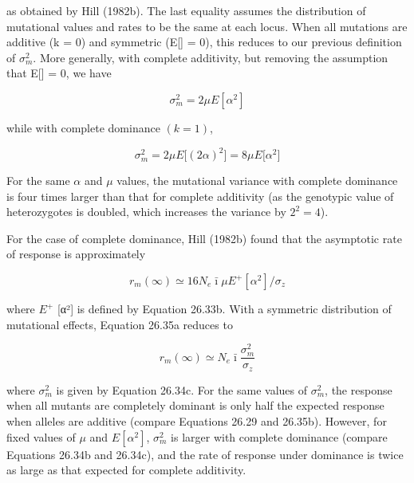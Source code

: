 \documentclass{article}
\begin{document}
{as obtained by Hill (1982b). The last equality assumes the distribution of mutational values and rates to be the same at each locus. When all mutations are additive (k = 0) and symmetric (E[\alpha] = 0), this reduces to our previous definition of  $ \sigma_m^2 $. More generally, with complete additivity, but removing the assumption that E[\alpha] = 0, we have

\begin{equation}
\sigma_{m}^{2}=2\mu E[\alpha^{2}]
\tag{26.34b}
\label{eq:26_34b}
\end{equation}

while with complete dominance  $ (k=1) $,

\begin{equation}
\sigma_{m}^{2}=2\mu E\big[\left(2\alpha\right)^{2}\big]=8\mu E\big[\alpha^{2}\big]
\tag{26.34c}
\label{eq:26_34c}
\end{equation}

For the same  $ \alpha $ and  $ \mu $ values, the mutational variance with complete dominance is four times larger than that for complete additivity (as the genotypic value of heterozygotes is doubled, which increases the variance by  $ 2^2 = 4 $).

For the case of complete dominance, Hill (1982b) found that the asymptotic rate of response is approximately

\begin{equation}
r_{m}(\infty)\simeq16N_{e}\bar{\imath}\mu E^{+}\left[\alpha^{2}\right]/\sigma_{z}
\tag{26.35a}
\label{eq:26_35a}
\end{equation}

where  $ E^{+} $ [α²] is defined by Equation 26.33b. With a symmetric distribution of mutational effects, Equation 26.35a reduces to

\begin{equation}
r_{m}(\infty)\simeq N_{e}\bar{\imath}\frac{\sigma_{m}^{2}}{\sigma_{z}}
\tag{26.35b}
\label{eq:26_35b}
\end{equation}

where  $ \sigma_m^2 $ is given by Equation 26.34c. For the same values of  $ \sigma_m^2 $, the response when all mutants are completely dominant is only half the expected response when alleles are additive (compare Equations 26.29 and 26.35b). However, for fixed values of  $ \mu $ and  $ E\left[\alpha^2\right] $,  $ \sigma_m^2 $ is larger with complete dominance (compare Equations 26.34b and 26.34c), and the rate of response under dominance is twice as large as that expected for complete additivity.

}
\end{document}

